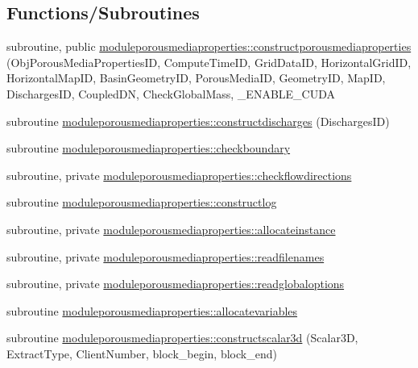 \subsection*{Functions/\+Subroutines}
\begin{DoxyCompactItemize}
\item 
subroutine, public \mbox{\hyperlink{namespacemoduleporousmediaproperties_a3be1252bc0db9785b9746ae093d82a5f}{moduleporousmediaproperties\+::constructporousmediaproperties}} (Obj\+Porous\+Media\+Properties\+ID, Compute\+Time\+ID, Grid\+Data\+ID, Horizontal\+Grid\+ID, Horizontal\+Map\+ID, Basin\+Geometry\+ID, Porous\+Media\+ID, Geometry\+ID, Map\+ID, Discharges\+ID, Coupled\+DN, Check\+Global\+Mass, \+\_\+\+E\+N\+A\+B\+L\+E\+\_\+\+C\+U\+DA
\item 
subroutine \mbox{\hyperlink{namespacemoduleporousmediaproperties_a6b8ea609b75df890d6efecde90bff1ac}{moduleporousmediaproperties\+::constructdischarges}} (Discharges\+ID)
\item 
subroutine \mbox{\hyperlink{namespacemoduleporousmediaproperties_a9384815199fb37590dac347563039152}{moduleporousmediaproperties\+::checkboundary}}
\item 
subroutine, private \mbox{\hyperlink{namespacemoduleporousmediaproperties_a63ce83aa045cf918fb7c8218fc07ff62}{moduleporousmediaproperties\+::checkflowdirections}}
\item 
subroutine \mbox{\hyperlink{namespacemoduleporousmediaproperties_a2bfe4b92207b55cc4167ccce04ea859f}{moduleporousmediaproperties\+::constructlog}}
\item 
subroutine, private \mbox{\hyperlink{namespacemoduleporousmediaproperties_aa100fa334641d2574c9b2965459d3dbf}{moduleporousmediaproperties\+::allocateinstance}}
\item 
subroutine, private \mbox{\hyperlink{namespacemoduleporousmediaproperties_a97ca52cdaf883bec238ac8f6844e5871}{moduleporousmediaproperties\+::readfilenames}}
\item 
subroutine, private \mbox{\hyperlink{namespacemoduleporousmediaproperties_a9215099aea454d7ad22a07e69b0b6065}{moduleporousmediaproperties\+::readglobaloptions}}
\item 
subroutine \mbox{\hyperlink{namespacemoduleporousmediaproperties_a266292445f08da6a7567576e04444458}{moduleporousmediaproperties\+::allocatevariables}}
\item 
subroutine \mbox{\hyperlink{namespacemoduleporousmediaproperties_a720c9abb0cbd672dacfd23a18a959f50}{moduleporousmediaproperties\+::constructscalar3d}} (Scalar3D, Extract\+Type, Client\+Number, block\+\_\+begin, block\+\_\+end)

\end{DoxyCompactItemize}
